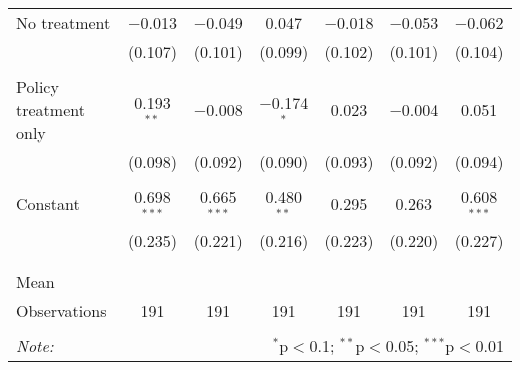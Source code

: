 \begin{tabular}{@{\extracolsep{5pt}}lcccccc}
 No treatment & $-$0.013 & $-$0.049 & 0.047 & $-$0.018 & $-$0.053 & $-$0.062 \\ 
  & (0.107) & (0.101) & (0.099) & (0.102) & (0.101) & (0.104) \\ 
  & & & & & & \\ 
 Policy treatment only & 0.193$^{**}$ & $-$0.008 & $-$0.174$^{*}$ & 0.023 & $-$0.004 & 0.051 \\ 
  & (0.098) & (0.092) & (0.090) & (0.093) & (0.092) & (0.094) \\ 
  & & & & & & \\ 
 Constant & 0.698$^{***}$ & 0.665$^{***}$ & 0.480$^{**}$ & 0.295 & 0.263 & 0.608$^{***}$ \\ 
  & (0.235) & (0.221) & (0.216) & (0.223) & (0.220) & (0.227) \\ 
  & & & & & & \\ 
\hline \\[-1.8ex] 
Mean &  &  &  &  &  &  \\ 
Observations & 191 & 191 & 191 & 191 & 191 & 191 \\ 
\hline 
\hline \\[-1.8ex] 
\textit{Note:}  & \multicolumn{6}{r}{$^{*}$p$<$0.1; $^{**}$p$<$0.05; $^{***}$p$<$0.01} \\ 
\end{tabular} 
